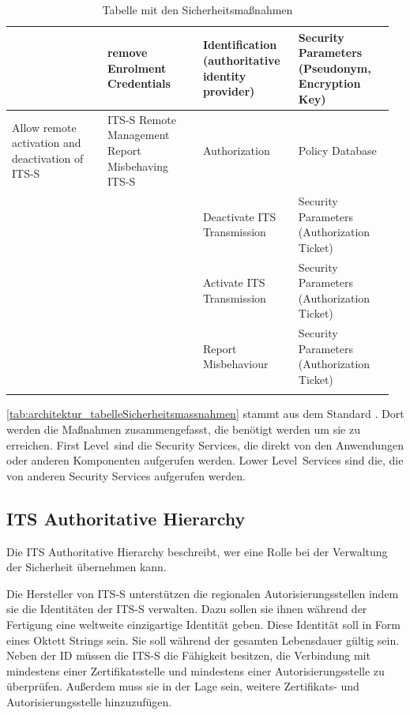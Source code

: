 \begin{longtable}{| p{0.24\linewidth} | p{0.24\linewidth} | p{0.24\linewidth} |p{0.24\linewidth}|}
\cline{2-4}
& remove Enrolment Credentials & Identification (authoritative identity provider) & Security Parameters (Pseudonym, Encryption Key)\\
\hline
Allow remote activation and deactivation of ITS-S & ITS-S Remote Management Report Misbehaving ITS-S & Authorization & Policy Database \\
\cline{3-4}
 & & Deactivate ITS Transmission & Security Parameters (Authorization Ticket) \\
 \cline{3-4}
& &  Activate ITS Transmission & Security Parameters (Authorization Ticket) \\
\cline{3-4}
& & Report Misbehaviour & Security Parameters (Authorization Ticket) \\
\hline 
\caption{Tabelle mit den Sicherheitsmaßnahmen \cite{ts102731}}
\label{tab:architektur_tabelleSicherheitsmassnahmen}
 
 \end{longtable}
\autoref{tab:architektur_tabelleSicherheitsmassnahmen} stammt aus dem Standard \cite{ts102731}. Dort werden die Maßnahmen zusammengefasst, die benötigt werden um sie zu erreichen. \glqq First Level\grqq~sind die Security Services, die direkt von den Anwendungen oder anderen Komponenten aufgerufen werden.  \glqq Lower Level\grqq~Services sind die, die von anderen Security Services aufgerufen werden.



\subsection{ITS Authoritative Hierarchy \label{architektur_itsAuthoriativeHierarchy}}
Die ITS Authoritative Hierarchy beschreibt, wer eine Rolle bei der Verwaltung der Sicherheit übernehmen kann. 

Die Hersteller von \ac{ITS-S} unterstützen die regionalen Autorisierungsstellen indem sie die Identitäten der \ac{ITS-S} verwalten. Dazu sollen sie ihnen während der Fertigung eine weltweite einzigartige Identität geben. Diese Identität soll  in Form eines Oktett Strings sein. Sie soll während der gesamten Lebensdauer gültig sein.
Neben der \ac{ID} müssen die \ac{ITS-S} die Fähigkeit besitzen, die Verbindung mit mindestens einer Zertifikatsstelle und mindestens einer Autorisierungsstelle zu überprüfen.  Außerdem muss sie in der Lage sein, weitere Zertifikats- und Autorisierungsstelle hinzuzufügen.

